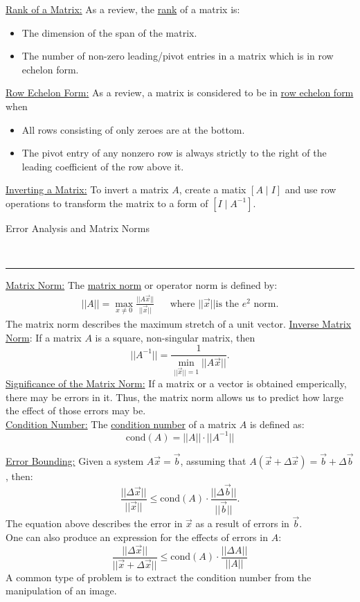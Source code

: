 \documentclass{article}
\newcommand{\header}[1]{\begin{large}\noindent #1\end{large}\\\rule{\textwidth}{0.5pt}}
\newcommand{\gap}{\medskip\\}
\begin{document}
    \underline{Rank of a Matrix:} As a review, the \underline{rank} of a matrix is:
    \begin{itemize}
        \item The dimension of the span of the matrix.
        \item The number of non-zero leading/pivot entries in a matrix which is
                in row echelon form.
    \end{itemize}

    \underline{Row Echelon Form:} As a review, a matrix is considered to be in \underline{row echelon form}
    when 
    \begin{itemize}
        \item All rows consisting of only zeroes are at the bottom.
        \item The pivot entry of any nonzero row is always strictly to the right of the
            leading coefficient of the row above it.
    \end{itemize}

    \underline{Inverting a Matrix:} To invert a matrix $A$, create a matix $[A \mid I]$ and
    use row operations to transform the matrix to a form of $[I \mid A^{-1}]$.
\gap
\header{Error Analysis and Matrix Norms}

\underline{Matrix Norm:} The \underline{matrix norm} or operator norm is defined by:
\begin{align*}
    ||A|| = \max_{x \neq 0} \frac{||A\vec{x}||}{||\vec{x}||} && \textrm{where } ||\vec{x}|| \textrm{is the } e^2 \textrm{ norm}.
\end{align*}
The matrix norm describes the maximum stretch of a unit vector.
\underline{Inverse Matrix Norm}: If a matrix $A$ is a square, non-singular matrix, then
\[
    ||A^{-1}|| = \frac{1}{\min_{||\vec{x}|| = 1}||A\vec{x}||}.
\]
\underline{Significance of the Matrix Norm:} If a matrix or a vector is obtained
emperically, there may be errors in it. Thus, the matrix norm allows us to predict
how large the effect of those errors may be.
\gap
\underline{Condition Number:} The \underline{condition number} of a matrix $A$ is 
defined as:
\[
    \textrm{cond}(A) = ||A||\cdot||A^{-1}||
\]

\underline{Error Bounding:} Given a system $A\vec{x} = \vec{b}$, assuming that
$A(\vec{x} + \Delta\vec{x}) = \vec{b} + \Delta \vec{b}$, then:
\[
    \frac{||\Delta\vec{x}||}{||\vec{x}||} \leq \textrm{cond}(A) \cdot \frac{||\Delta \vec{b}||}{||\vec{b}||}.
\]
The equation above describes the error in $\vec{x}$ as a result of errors in $\vec{b}$.
\gap
One can also produce an expression for the effects of errors in $A$:
\[
    \frac{||\Delta \vec{x}||}{||\vec{x} + \Delta \vec{x}||} \leq \textrm{cond}(A) \cdot \frac{||\Delta A||}{||A||}  
\]
A common type of problem is to extract the condition number from the manipulation of
an image.
\end{document}
